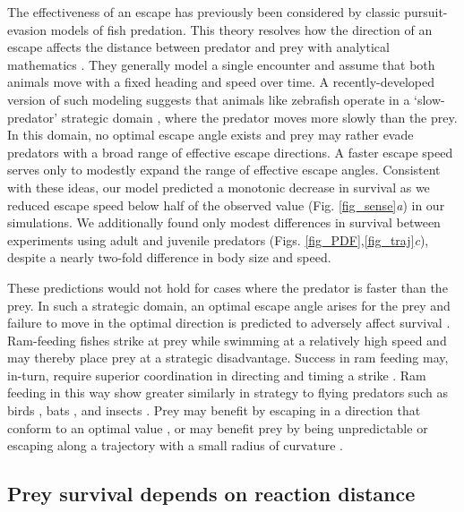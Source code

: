 \documentclass[]{rsos}%
\begin{document}
The effectiveness of an escape has previously been considered by classic pursuit-evasion models of fish predation.
This theory resolves how the direction of an escape affects the distance between predator and prey with analytical mathematics \cite{Isaacs:1965uz,Weihs:1984tb}. 
They generally model a single encounter and assume that both animals move with a fixed heading and speed over time. 
A recently-developed version of such modeling suggests that animals like zebrafish operate in a `slow-predator' strategic domain \cite{Soto:2015cj}, where the predator moves more slowly than the prey.
In this domain, no optimal escape angle exists and prey may rather evade predators with a broad range of effective escape directions.
A faster escape speed serves only to modestly expand the range of effective escape angles. 
Consistent with these ideas, our model predicted a monotonic decrease in survival as we reduced escape speed below half of the observed value (Fig. \ref{fig_sense}\textit{a}) in our simulations. 
We additionally found only modest differences in survival between experiments using adult and juvenile predators (Figs. \ref{fig_PDF},\ref{fig_traj}\textit{c}), despite a nearly two-fold difference in body size and speed.

These predictions would not hold for cases where the predator is faster than the prey.
In such a strategic domain, an optimal escape angle arises for the prey and failure to move in the optimal direction is predicted to adversely affect survival \cite{Soto:2015cj,Weihs:1984tb}. 
Ram-feeding fishes strike at prey while swimming at a relatively high speed and may thereby place prey at a strategic disadvantage.
Success in ram feeding may, in-turn, require superior coordination in directing and timing a strike \cite{Wainwright:2001ufa}.
Ram feeding in this way show greater similarly in strategy to flying predators such as birds \cite{Shifferman:2004fs}, bats \cite{Ghose:2006dk}, and insects \cite{Combes:2012et}.
Prey may benefit by escaping in a direction that conform to an optimal value \cite{Weihs:1984tb}, or may benefit prey by being unpredictable \cite{Humphries:1970hy} or escaping along a trajectory with a small radius of curvature \cite{Howland:1974ud,Corcoran:2016ed}.

\subsection{Prey survival depends on reaction distance} 
\end{document}
